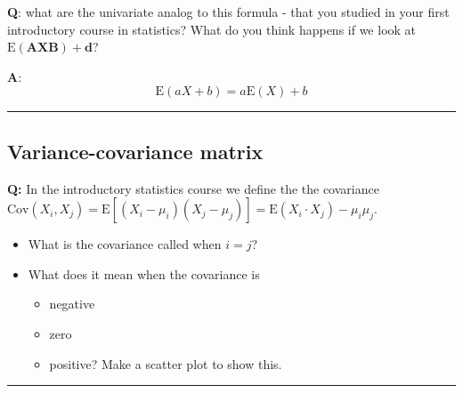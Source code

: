 \documentclass[]{article}
\providecommand{\tightlist}{%
  \setlength{\itemsep}{0pt}\setlength{\parskip}{0pt}}
\begin{document}
\textbf{Q}: what are the univariate analog to this formula - that you
studied in your first introductory course in statistics? What do you
think happens if we look at
\(\text{E}(\mathbf{A}\mathbf{X}\mathbf{B})+\mathbf{d}\)?

\textbf{A}: \[\text{E}(aX+b)=a \text{E}(X)+b\]

\begin{center}\rule{0.5\linewidth}{\linethickness}\end{center}

\hypertarget{variance-covariance-matrix}{%
\subsection{Variance-covariance
matrix}\label{variance-covariance-matrix}}

\textbf{Q:} In the introductory statistics course we define the the
covariance
\(\text{Cov}(X_i,X_j)=\text{E}[(X_i-\mu_i)(X_j-\mu_j)]=\text{E}(X_i \cdot X_j)-\mu_i\mu_j\).

\begin{itemize}
\tightlist
\item
  What is the covariance called when \(i=j\)?
\item
  What does it mean when the covariance is

  \begin{itemize}
  \tightlist
  \item
    negative
  \item
    zero
  \item
    positive? Make a scatter plot to show this.
  \end{itemize}
\end{itemize}

\begin{center}\rule{0.5\linewidth}{\linethickness}\end{center}
\end{document}
